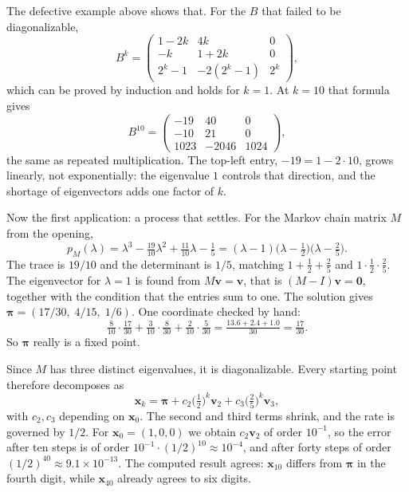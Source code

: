 The defective example above shows that. For the $B$ that failed to be diagonalizable,
\[
  B^{k}=
  \begin{pmatrix}1-2k&4k&0\\ -k&1+2k&0\\ 2^{k}-1&-2(2^{k}-1)&2^{k}\end{pmatrix},
\]
which can be proved by induction and holds for $k=1$. At $k=10$ that formula gives
\[
  B^{10}=\begin{pmatrix}-19&40&0\\ -10&21&0\\ 1023&-2046&1024\end{pmatrix},
\]
the same as repeated multiplication. The top-left entry, $-19=1-2\cdot10$, grows linearly, not
exponentially: the eigenvalue $1$ controls that direction, and the shortage of eigenvectors adds
one factor of $k$.

Now the first application: a process that settles. For the Markov chain matrix $M$ from the
opening,
\[
  p_{M}(\lambda)=\lambda^{3}-\tfrac{19}{10}\lambda^{2}+\tfrac{11}{10}\lambda-\tfrac15
  =(\lambda-1)\bigl(\lambda-\tfrac12\bigr)\bigl(\lambda-\tfrac25\bigr).
\]
The trace is $19/10$ and the determinant is $1/5$, matching $1+\tfrac12+\tfrac25$ and
$1\cdot\tfrac12\cdot\tfrac25$. The eigenvector for $\lambda=1$ is found from $M\mathbf{v}=
\mathbf{v}$, that is $(M-I)\mathbf{v}=\mathbf{0}$, together with the condition that the entries sum
to one. The solution gives $\boldsymbol{\pi}=(17/30,\;4/15,\;1/6)$. One coordinate checked by hand:
\[
  \tfrac{8}{10}\cdot\tfrac{17}{30}+\tfrac{3}{10}\cdot\tfrac{8}{30}
  +\tfrac{2}{10}\cdot\tfrac{5}{30}
  =\tfrac{13.6+2.4+1.0}{30}=\tfrac{17}{30}.
\]
So $\boldsymbol{\pi}$ really is a fixed point.

Since $M$ has three distinct eigenvalues, it is diagonalizable. Every starting point therefore
decomposes as
\[
  \mathbf{x}_{k}=\boldsymbol{\pi}+c_{2}\bigl(\tfrac12\bigr)^{k}\mathbf{v}_{2}
  +c_{3}\bigl(\tfrac25\bigr)^{k}\mathbf{v}_{3},
\]
with $c_{2},c_{3}$ depending on $\mathbf{x}_{0}$. The second and third terms shrink, and the rate
is governed by $1/2$. For $\mathbf{x}_{0}=(1,0,0)$ we obtain $c_{2}\mathbf{v}_{2}$ of order
$10^{-1}$, so the error after ten steps is of order
$10^{-1}\cdot(1/2)^{10}\approx10^{-4}$, and after forty steps of order
$(1/2)^{40}\approx9.1\times10^{-13}$. The computed result agrees: $\mathbf{x}_{10}$ differs from
$\boldsymbol{\pi}$ in the fourth digit, while $\mathbf{x}_{40}$ already agrees to six digits.

